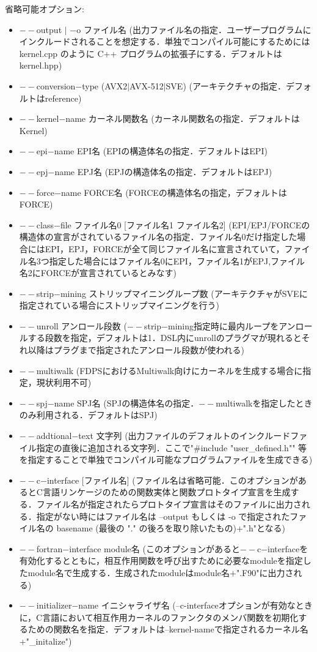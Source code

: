 \documentclass{article}
\begin{document}
   省略可能オプション:
    \begin{itemize}
   \item $--$output $|$ $-$o  ファイル名 (出力ファイル名の指定．ユーザープログラムにインクルードされることを想定する．単独でコンパイル可能にするためには kernel.cpp のように C++ プログラムの拡張子にする．デフォルトはkernel.hpp)
   \item $--$conversion$-$type (AVX2$|$AVX-512$|$SVE) (アーキテクチャの指定．デフォルトはreference)
   \item $--$kernel$-$name カーネル関数名 (カーネル関数名の指定．デフォルトはKernel)
   \item $--$epi$-$name EPI名 (EPIの構造体名の指定．デフォルトはEPI)
   \item $--$epj$-$name EPJ名 (EPJの構造体名の指定．デフォルトはEPJ)
   \item $--$force$-$name FORCE名 (FORCEの構造体名の指定，デフォルトはFORCE)
   \item $--$class$-$file ファイル名0 [ファイル名1 ファイル名2] (EPI/EPJ/FORCEの構造体の宣言がされているファイル名の指定．ファイル名0だけ指定した場合にはEPI，EPJ，FORCEが全て同じファイル名に宣言されていて，ファイル名3つ指定した場合にはファイル名0にEPI，ファイル名1がEPJ,ファイル名2にFORCEが宣言されているとみなす)
   \item $--$strip$-$mining ストリップマイニングループ数 (アーキテクチャがSVEに指定されている場合にストリップマイニングを行う)
   \item $--$unroll アンロール段数 ($--$strip$-$mining指定時に最内ループをアンロールする段数を指定，デフォルトは1．DSL内にunrollのプラグマが現れるとそれ以降はプラグまで指定されたアンロール段数が使われる)
   \item $--$multiwalk (FDPSにおけるMultiwalk向けにカーネルを生成する場合に指定，現状利用不可)
   \item $--$spj$-$name SPJ名 (SPJの構造体名の指定．$--$multiwalkを指定したときのみ利用される．デフォルトはSPJ)
   \item $--$addtional$-$text 文字列 (出力ファイルのデフォルトのインクルードファイル指定の直後に追加される文字列．ここで"\#include "user\_defined.h"" 等を指定することで単独でコンパイル可能なプログラムファイルを生成できる)
   \item $--$c$-$interface [ファイル名] (ファイル名は省略可能．このオプションがあるとC言語リンケージのための関数実体と関数プロトタイプ宣言を生成する．ファイル名が指定されたらプロトタイプ宣言はそのファイルに出力される．指定がない時にはファイル名は --output もしくは -o で指定されたファイル名の basename (最後の "." の後ろを取り除いたもの)+".h"となる)
   \item $--$fortran$-$interface module名 (このオプションがあると$--$c$-$interfaceを有効化するとともに，相互作用関数を呼び出すために必要なmoduleを指定したmodule名で生成する．生成されたmoduleはmodule名$+$".F90"に出力される)
   \item $--$initializer$-$name イニシャライザ名 (--c-interfaceオプションが有効なときに，C言語において相互作用カーネルのファンクタのメンバ関数を初期化するための関数名を指定．デフォルトは--kernel-nameで指定されるカーネル名+"\_initalize")
    \end{itemize}
\end{document}
